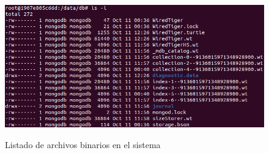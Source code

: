 \documentclass[10pt,a4paper]{article}
\begin{document}
\begin{figure}[h!]
  \centering
  \includegraphics[scale=0.4]{mongobinaries.png}\\
  \caption{Listado de archivos binarios en el sistema}
  \label{fig:mongo_bin}
\end{figure}

\pagebreak
\subsection{}
\end{document}
